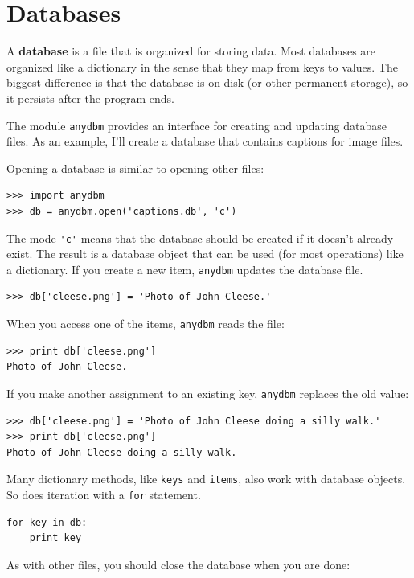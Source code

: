 \documentclass[10pt]{book}
\begin{document}
\begin{CJK}{UTF8}{gbsn}
\begin{exercise}
\end{exercise}


\section{Databases}

A {\bf database} is a file that is organized for storing data.
Most databases are organized like a dictionary in the sense
that they map from keys to values.  The biggest difference
is that the database is on disk (or other permanent storage),
so it persists after the program ends.

The module {\tt anydbm} provides an interface for creating
and updating database files.  As an example, I'll create a database
that contains captions for image files.

Opening a database is similar to opening other files:

\begin{verbatim}
>>> import anydbm
>>> db = anydbm.open('captions.db', 'c')
\end{verbatim}
%
The mode \verb"'c'" means that the database should be created if
it doesn't already exist.  The result is a database object
that can be used (for most operations) like a dictionary.
If you create a new item, {\tt anydbm} updates the database file.


\begin{verbatim}
>>> db['cleese.png'] = 'Photo of John Cleese.'
\end{verbatim}
%
When you access one of the items, {\tt anydbm} reads the file:

\begin{verbatim}
>>> print db['cleese.png']
Photo of John Cleese.
\end{verbatim}
%
If you make another assignment to an existing key, {\tt anydbm} replaces
the old value:

\begin{verbatim}
>>> db['cleese.png'] = 'Photo of John Cleese doing a silly walk.'
>>> print db['cleese.png']
Photo of John Cleese doing a silly walk.
\end{verbatim}
%
Many dictionary methods, like {\tt keys} and {\tt items}, also
work with database objects.  So does iteration with a {\tt for}
statement.

\begin{verbatim}
for key in db:
    print key
\end{verbatim}
%
As with other files, you should close the database when you are
done:


\end{CJK}
\end{document}
